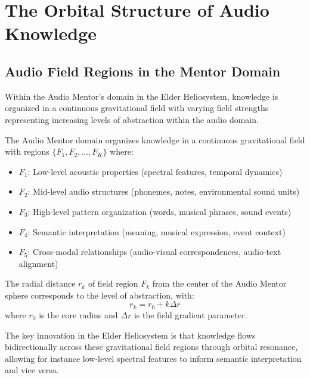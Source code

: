 \section{The Orbital Structure of Audio Knowledge}

\subsection{Audio Field Regions in the Mentor Domain}

Within the Audio Mentor's domain in the Elder Heliosystem, knowledge is organized in a continuous gravitational field with varying field strengths representing increasing levels of abstraction within the audio domain.

\begin{definition}
The Audio Mentor domain organizes knowledge in a continuous gravitational field with regions $\{F_1, F_2, \ldots, F_K\}$ where:
\begin{itemize}
    \item $F_1$: Low-level acoustic properties (spectral features, temporal dynamics)
    \item $F_2$: Mid-level audio structures (phonemes, notes, environmental sound units)
    \item $F_3$: High-level pattern organization (words, musical phrases, sound events)
    \item $F_4$: Semantic interpretation (meaning, musical expression, event context)
    \item $F_5$: Cross-modal relationships (audio-visual correspondences, audio-text alignment)
\end{itemize}
\end{definition}

\begin{proposition}
The radial distance $r_k$ of field region $F_k$ from the center of the Audio Mentor sphere corresponds to the level of abstraction, with:
\begin{equation}
r_k = r_0 + k \Delta r
\end{equation}
where $r_0$ is the core radius and $\Delta r$ is the field gradient parameter.
\end{proposition}

The key innovation in the Elder Heliosystem is that knowledge flows bidirectionally across these gravitational field regions through orbital resonance, allowing for instance low-level spectral features to inform semantic interpretation and vice versa.


